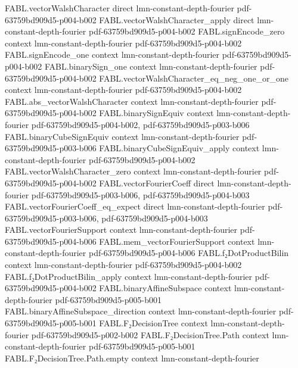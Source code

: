 \begin{theorem}
  {FABL.vectorWalshCharacter}
  {direct}
  {lmn-constant-depth-fourier}
  {pdf-63759bd909d5-p004-b002}
\proofstep
  {FABL.vectorWalshCharacter_apply}
  {direct}
  {lmn-constant-depth-fourier}
  {pdf-63759bd909d5-p004-b002}
\proofstep
  {FABL.signEncode_zero}
  {context}
  {lmn-constant-depth-fourier}
  {pdf-63759bd909d5-p004-b002}
\proofstep
  {FABL.signEncode_one}
  {context}
  {lmn-constant-depth-fourier}
  {pdf-63759bd909d5-p004-b002}
\proofstep
  {FABL.binarySign_one}
  {context}
  {lmn-constant-depth-fourier}
  {pdf-63759bd909d5-p004-b002}
\proofstep
  {FABL.vectorWalshCharacter_eq_neg_one_or_one}
  {context}
  {lmn-constant-depth-fourier}
  {pdf-63759bd909d5-p004-b002}
\proofstep
  {FABL.abs_vectorWalshCharacter}
  {context}
  {lmn-constant-depth-fourier}
  {pdf-63759bd909d5-p004-b002}
\proofstep
  {FABL.binarySignEquiv}
  {context}
  {lmn-constant-depth-fourier}
  {pdf-63759bd909d5-p004-b002,
    pdf-63759bd909d5-p003-b006}
\proofstep
  {FABL.binaryCubeSignEquiv}
  {context}
  {lmn-constant-depth-fourier}
  {pdf-63759bd909d5-p003-b006}
\proofstep
  {FABL.binaryCubeSignEquiv_apply}
  {context}
  {lmn-constant-depth-fourier}
  {pdf-63759bd909d5-p004-b002}
\proofstep
  {FABL.vectorWalshCharacter_zero}
  {context}
  {lmn-constant-depth-fourier}
  {pdf-63759bd909d5-p004-b002}
\proofstep
  {FABL.vectorFourierCoeff}
  {direct}
  {lmn-constant-depth-fourier}
  {pdf-63759bd909d5-p003-b006,
    pdf-63759bd909d5-p004-b003}
\proofstep
  {FABL.vectorFourierCoeff_eq_expect}
  {direct}
  {lmn-constant-depth-fourier}
  {pdf-63759bd909d5-p003-b006,
    pdf-63759bd909d5-p004-b003}
\proofstep
  {FABL.vectorFourierSupport}
  {context}
  {lmn-constant-depth-fourier}
  {pdf-63759bd909d5-p004-b006}
\proofstep
  {FABL.mem_vectorFourierSupport}
  {context}
  {lmn-constant-depth-fourier}
  {pdf-63759bd909d5-p004-b006}
\proofstep
  {FABL.f₂DotProductBilin}
  {context}
  {lmn-constant-depth-fourier}
  {pdf-63759bd909d5-p004-b002}
\proofstep
  {FABL.f₂DotProductBilin_apply}
  {context}
  {lmn-constant-depth-fourier}
  {pdf-63759bd909d5-p004-b002}
\proofstep
  {FABL.binaryAffineSubspace}
  {context}
  {lmn-constant-depth-fourier}
  {pdf-63759bd909d5-p005-b001}
\proofstep
  {FABL.binaryAffineSubspace_direction}
  {context}
  {lmn-constant-depth-fourier}
  {pdf-63759bd909d5-p005-b001}
\proofstep
  {FABL.F₂DecisionTree}
  {context}
  {lmn-constant-depth-fourier}
  {pdf-63759bd909d5-p002-b002}
\proofstep
  {FABL.F₂DecisionTree.Path}
  {context}
  {lmn-constant-depth-fourier}
  {pdf-63759bd909d5-p005-b001}
\proofstep
  {FABL.F₂DecisionTree.Path.empty}
  {context}
  {lmn-constant-depth-fourier}

\end{theorem}
